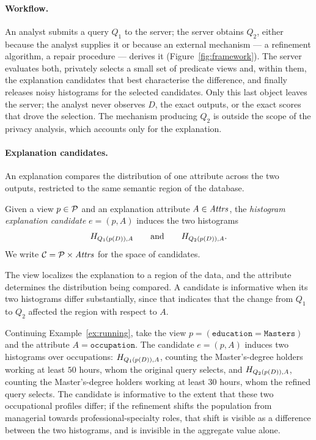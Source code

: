 \paragraph{Workflow.}
An analyst submits a query $Q_1$ to the server; the server obtains $Q_2$, either because the analyst supplies it or because an external mechanism --- a refinement algorithm, a repair procedure --- derives it (Figure~\ref{fig:framework}).
The server evaluates both, privately selects a small set of predicate views and, within them, the explanation candidates that best characterise the difference, and finally releases noisy histograms for the selected candidates.
Only this last object leaves the server; the analyst never observes $D$, the exact outputs, or the exact scores that drove the selection.
The mechanism producing $Q_2$ is outside the scope of the privacy analysis, which accounts only for the explanation.

\paragraph{Explanation candidates.}
An explanation compares the distribution of one attribute across the two outputs, restricted to the same semantic region of the database.

\begin{definition}
\label{def:candidate}
Given a view $p\in\mathcal{P}$ and an explanation attribute $A\in\mathit{Attrs}$, the \emph{histogram explanation candidate} $e=(p,A)$ induces the two histograms
\[
    H_{Q_1(p(D)),A}
    \qquad\text{and}\qquad
    H_{Q_2(p(D)),A}.
\]
We write $\mathcal{C}=\mathcal{P}\times\mathit{Attrs}$ for the space of candidates.
\end{definition}

The view localizes the explanation to a region of the data, and the attribute determines the distribution being compared.
A candidate is informative when its two histograms differ substantially, since that indicates that the change from $Q_1$ to $Q_2$ affected the region with respect to $A$.

\begin{example}
\label{ex:candidate}
Continuing Example~\ref{ex:running}, take the view $p=(\texttt{education}=\texttt{Masters})$ and the attribute $A=\texttt{occupation}$.
The candidate $e=(p,A)$ induces two histograms over occupations: $H_{Q_1(p(D)),A}$, counting the Master's-degree holders working at least $50$ hours, whom the original query selects, and $H_{Q_2(p(D)),A}$, counting the Master's-degree holders working at least $30$ hours, whom the refined query selects.
The candidate is informative to the extent that these two occupational profiles differ; if the refinement shifts the population from managerial towards professional-specialty roles, that shift is visible as a difference between the two histograms, and is invisible in the aggregate value alone.
\end{example}

